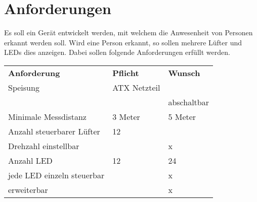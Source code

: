 



\section{Anforderungen}
Es soll ein Gerät entwickelt werden, mit welchem die Anwesenheit von Personen 
erkannt werden soll. Wird eine Person erkannt, so sollen mehrere Lüfter und 
LEDs dies anzeigen. Dabei sollen folgende Anforderungen erfüllt werden. 

\begin{table}[h!]
  \begin{tabular}{@{}p{}p{}p{}}
    \rowcolor{white} \textbf{Anforderung}     & \textbf{Pflicht} & \textbf{Wunsch}\\
    \rowcolor{lgray} Speisung                 & ATX Netzteil     &                \\
    \rowcolor{lgray}                          &                  & abschaltbar    \\
    \rowcolor{white} Minimale Messdistanz     & 3 Meter          & 5 Meter        \\
    \rowcolor{lgray} Anzahl steuerbarer Lüfter& 12               &                \\
    \rowcolor{white} Drehzahl einstellbar     &                  & x              \\
    \rowcolor{lgray} Anzahl LED               & 12               & 24             \\
    \rowcolor{white} jede LED einzeln steuerbar &                & x              \\
    \rowcolor{lgray} erweiterbar              &                  & x              \\
  \end{tabular}
  \label{tab:anforderungen}
\end{table}
